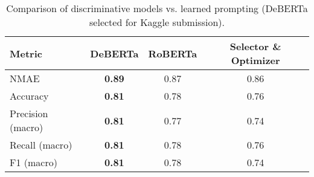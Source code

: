 \begin{table}[ht]
\centering
\caption{Comparison of discriminative models vs. learned prompting (DeBERTa selected for Kaggle submission).}
\vspace{2pt}
\begin{adjustbox}{width=\columnwidth}
\begin{tabular}{lccc}
\toprule
\textbf{Metric}               & \textbf{DeBERTa} & \textbf{RoBERTa} & \textbf{Selector \& Optimizer} \\
\midrule
NMAE                          & \textbf{0.89}           & 0.87           & 0.86                        \\
Accuracy                      & \textbf{0.81}           & 0.78           & 0.76                        \\
Precision (macro)             & \textbf{0.81}           & 0.77          & 0.74                         \\
Recall (macro)                & \textbf{0.81}         & 0.78          & 0.76                         \\
F1 (macro)                    & \textbf{0.81}           & 0.78          & 0.74                         \\
\bottomrule
\end{tabular}
\end{adjustbox}
\label{table:finetune}
\end{table}